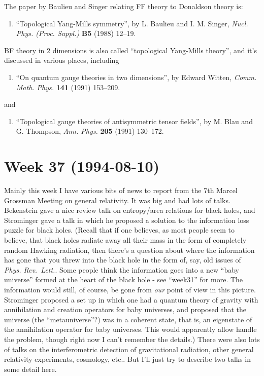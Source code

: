 \documentclass{article}
\def\tightlist{}
\begin{document}
The paper by Baulieu and Singer relating FF theory to Donaldson theory
is:

\begin{enumerate}
\def\labelenumi{\arabic{enumi})}
\setcounter{enumi}{3}
\tightlist
\item
  ``Topological Yang-Mills symmetry'', by L. Baulieu and I. M. Singer,
  \emph{Nucl. Phys. (Proc. Suppl.)} \textbf{B5} (1988) 12--19.
\end{enumerate}

BF theory in 2 dimensions is also called ``topological Yang-Mills
theory'', and it's discussed in various places, including

\begin{enumerate}
\def\labelenumi{\arabic{enumi})}
\setcounter{enumi}{4}
\tightlist
\item
  ``On quantum gauge theories in two dimensions'', by Edward Witten,
  \emph{Comm. Math. Phys.} \textbf{141} (1991) 153--209.
\end{enumerate}

and

\begin{enumerate}
\def\labelenumi{\arabic{enumi})}
\setcounter{enumi}{5}
\tightlist
\item
  ``Topological gauge theories of antisymmetric tensor fields'', by M.
  Blau and G. Thompson, \emph{Ann. Phys.} \textbf{205} (1991) 130--172.
\end{enumerate}
\hypertarget{week-37-1994-08-10}{%
\section{Week 37 (1994-08-10)}\label{week-37-1994-08-10}}

Mainly this week I have various bits of news to report from the 7th
Marcel Grossman Meeting on general relativity. It was big and had lots
of talks. Bekenstein gave a nice review talk on entropy/area relations
for black holes, and Strominger gave a talk in which he proposed a
solution to the information loss puzzle for black holes. (Recall that if
one believes, as most people seem to believe, that black holes radiate
away all their mass in the form of completely random Hawking radiation,
then there's a question about where the information has gone that you
threw into the black hole in the form of, say, old issues of \emph{Phys.
Rev.~Lett.}. Some people think the information goes into a new ``baby
universe'' formed at the heart of the black hole - see ``week31'' for
more. The information would still, of course, be gone from \emph{our}
point of view in this picture. Strominger proposed a set up in which one
had a quantum theory of gravity with annihilation and creation operators
for baby universes, and proposed that the universe (the
``metauniverse''?) was in a coherent state, that is, an eigenstate of
the annihilation operator for baby universes. This would apparently
allow handle the problem, though right now I can't remember the
details.) There were also lots of talks on the interferometric detection
of gravitational radiation, other general relativity experiments,
cosmology, etc.. But I'll just try to describe two talks in some detail
here.
\end{document}
